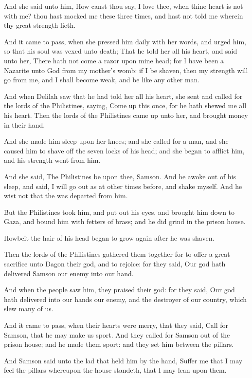 \Verse And she said unto him, How canst thou say, I love thee, when thine heart is not with me? thou hast mocked me these three times, and hast not told me wherein thy great strength lieth.

\Verse And it came to pass, when she pressed him daily with her words, and urged him, so that his soul was vexed unto death; \Verse That he told her all his heart, and said unto her, There hath not come a razor upon mine head; for I have been a Nazarite unto God from my mother's womb: if I be shaven, then my strength will go from me, and I shall become weak, and be like any other man.

\Verse And when Delilah saw that he had told her all his heart, she sent and called for the lords of the Philistines, saying, Come up this once, for he hath shewed me all his heart. Then the lords of the Philistines came up unto her, and brought money in their hand.

\Verse And she made him sleep upon her knees; and she called for a man, and she caused him to shave off the seven locks of his head; and she began to afflict him, and his strength went from him.

\Verse And she said, The Philistines be upon thee, Samson. And he awoke out of his sleep, and said, I will go out as at other times before, and shake myself. And he wist not that the \LORD was departed from him.

\Verse But the Philistines took him, and put out his eyes, and brought him down to Gaza, and bound him with fetters of brass; and he did grind in the prison house.

\Verse Howbeit the hair of his head began to grow again after he was shaven.

\Verse Then the lords of the Philistines gathered them together for to offer a great sacrifice unto Dagon their god, and to rejoice: for they said, Our god hath delivered Samson our enemy into our hand.

\Verse And when the people saw him, they praised their god: for they said, Our god hath delivered into our hands our enemy, and the destroyer of our country, which slew many of us.

\Verse And it came to pass, when their hearts were merry, that they said, Call for Samson, that he may make us sport. And they called for Samson out of the prison house; and he made them sport: and they set him between the pillars.

\Verse And Samson said unto the lad that held him by the hand, Suffer me that I may feel the pillars whereupon the house standeth, that I may lean upon them.

